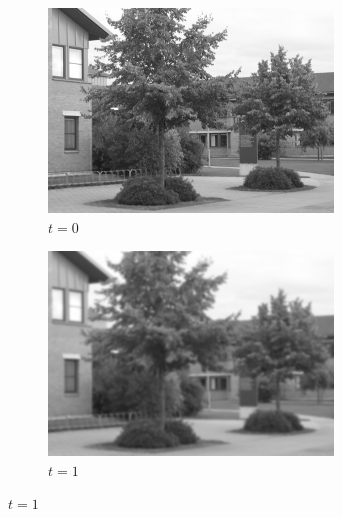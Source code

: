 \documentclass[a4paper,12pt]{article}
\begin{document}
\begin{figure}[h]
    \centering

    \begin{subfigure}[b]{0.4\linewidth}
    \includegraphics[width=\linewidth]{Scalespace0.png}
    \caption{$t=0$}
    \end{subfigure}
    \begin{subfigure}[b]{0.4\linewidth}
    \includegraphics[width=\linewidth]{Scalespace1.png}
    \caption{$t=1$}
    \end{subfigure}


\end{figure}
\end{document}
